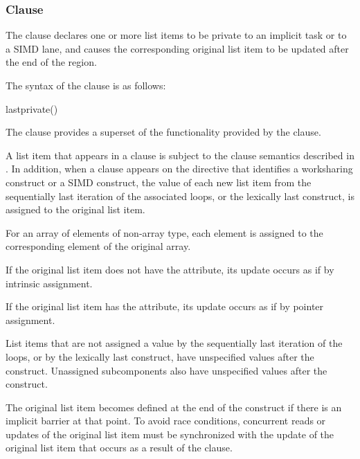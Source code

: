 \subsubsection{ Clause}
\label{subsubsec:lastprivate clause}
\summary
The  clause declares one or more list items to be private to an implicit 
task or to a SIMD lane, and causes the corresponding original list item to be updated 
after the end of the region. 

\syntax
The syntax of the  clause is as follows:

\begin{boxedcode}
lastprivate()
\end{boxedcode}

\descr
The  clause provides a superset of the functionality provided by the 
 clause.

A list item that appears in a  clause is subject to the  clause 
semantics described in 
. 
In addition, when a 
 clause appears on the directive that identifies a worksharing construct 
or a SIMD construct, the value of each new list item from the sequentially last iteration 
of the associated loops, or the lexically last  construct, is assigned to the 
original list item. 

\ccppspecificstart
For an array of elements of non-array type, each element is assigned to the 
corresponding element of the original array.
\ccppspecificend
\bigskip

\begin{samepage}
\fortranspecificstart
If the original list item does not have the  attribute, its update occurs as if by 
intrinsic assignment.
\end{samepage}

If the original list item has the  attribute, its update occurs as if by pointer 
assignment.
\fortranspecificend

List items that are not assigned a value by the sequentially last iteration of the loops, or 
by the lexically last  construct, have unspecified values after the construct. 
Unassigned subcomponents also have unspecified values after the construct.

The original list item becomes defined at the end of the construct if there is an implicit 
barrier at that point. To avoid race conditions, concurrent reads or updates of the original 
list item must be synchronized with the update of the original list item that occurs as a 
result of the  clause.

